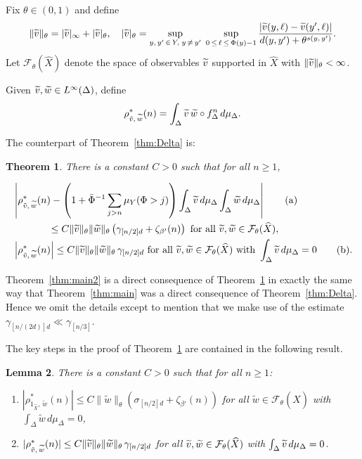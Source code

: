 \documentclass[10pt]{amsart}
\newtheorem{theo}{Theorem}[section]
\newtheorem{lemm}[theo]{Lemma}\newtheorem{prop}[theo]{Proposition}\newtheorem{coro}[theo]{Corollary}\newtheorem{conj}[theo]{Conjecture}
\theoremstyle{definition}\newtheorem{defi}[theo]{Definition}\newtheorem{rema}[theo]{Remark}\newtheorem{exam}[theo]{Example}\newtheorem{exem}[theo]{Example}\newtheorem{nota}[theo]{Notation}
\newcommand{\cF}{\mathcal{F}}
\newcommand{\hX}{\widehat{X}}
\newcommand{\tw}{\widetilde{w}}
\newcommand{\tv}{\tilde{v}}
\newcommand{\bPhi}{\bar{\Phi}}
\newcommand*{\alphenumi}{\renewcommand*{\theenumi}{\alph{enumi}}}
\let\oldtilde\tilde
\renewcommand*{\tilde}[1]{\mathchoice{\widetilde{#1}}{\widetilde{#1}}{\oldtilde{#1}}{\oldtilde{#1}}}
\begin{document}
Fix $\theta\in(0,1)$ and define
\begin{equation}\label{eq:norm}
\|\tv\|_\theta=|\tv|_\infty+|\tv|_\theta, \quad |\tv|_\theta =\sup_{y,\,y'\,\in\,Y,\;y\,\neq\,y'}\;\sup_{0\,\le\,\ell\,\le\,\Phi(y)-1}
\frac{|\tv(y,\ell)-\tv(y',\ell)|}{d(y,y')+\theta^{s(y,\,y')}}.
\end{equation}
Let $\cF_\theta(\hX)$ denote the space of observables $\tv$ supported in $\hX$ with $\|\tv\|_\theta<\infty$.

Given $\tv,\tw\in L^\infty(\Delta)$, define
\[
\rho^*_{\tv,\,\tw}(n)=\int_\Delta \tv\,\tw\circ f_\Delta^n\,d\mu_\Delta.
\]

The counterpart of Theorem~\ref{thm:Delta} is:

\begin{theo} \label{thm:Delta2}
There is a constant $C>0$ such that for all $n\ge1$,

\begin{align}
&\left|\rho^*_{\tv,\,\tw}(n)-\left(1+\bPhi^{-1}\sum_{j>n} \mu_Y(\Phi>j)\right)\int_\Delta\tv\,d\mu_\Delta\int_\Delta\tw\,d\mu_\Delta\right|\tag{${\rm a}$}\label{theo7.6.1}\\
&\mkern65mu\le C\|\tv\|_\theta\|\tw\|_\theta\left(\gamma_{[n/2]d}+\zeta_{\beta'}(n)\right)\text{ for all }\tv,\tw\in \cF_\theta(\hX),\nonumber\\
&\left|\rho^*_{\tv,\,\tw}(n)\right|\le C\|\tv\|_\theta\|\tw\|_\theta\,\gamma_{[n/2]d}\text{ for all }\tv,\tw\in \cF_\theta(\hX)\text{ with }\int_\Delta \tv\,d\mu_\Delta=0\tag{${\rm b}$}\label{theo7.6.2}.
\end{align}
\end{theo}

Theorem~\ref{thm:main2} is a direct consequence of Theorem~\ref{thm:Delta2} in exactly the same way that Theorem~\ref{thm:main} was a direct consequence of Theorem~\ref{thm:Delta}. Hence we omit the details except to mention that we make use of the estimate $\gamma_{[n/(2d)]d}\ll \gamma_{[n/3]}$.

The key steps in the proof of Theorem~\ref{thm:Delta2} are contained in the following result.

\begin{lemm}\label{lem:Delta2}
There is a constant $C>0$ such that for all $n\ge1$:
\begin{enumerate}\alphenumi
\item \label{lemm7.7.1}$|\rho^*_{1_{\hX},\,\tw}(n)|\le C\|\tw\|_\theta(\sigma_{[n/2]d}+\zeta_{\beta'}(n))$ for all $\tw\in \cF_\theta(\hX)$ with $\int_\Delta \tw\,d\mu_\Delta=0$,
\item \label{lemm7.7.2}$|\rho^*_{\tv,\,\tw}(n)|
\le C\|\tv\|_\theta\|\tw\|_\theta\,\gamma_{[n/2]d} $ for all $\tv,\tw\in\cF_\theta(\hX)$ with $\int_\Delta \tv\,d\mu_\Delta=0$.
\end{enumerate}
\end{lemm}
\end{document}
